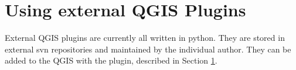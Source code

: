 \section{Using external QGIS Plugins}\label{sec:external_plugins}

\updatedisclaimer

External QGIS plugins are currently all written in python. They are stored 
in external svn repositories and maintained by the individual author. They 
can be added to the QGIS  with the 
 plugin, described in Section 
\ref{sec:external_plugins}.


